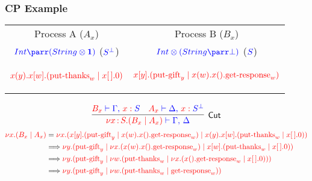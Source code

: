\documentclass{beamer}
\let\oldframetitle\frametitle
\renewcommand{\frametitle}[1]{
  \oldframetitle{#1}\vspace{-3.5cm}
}
\newcommand{\ftitle}[2]{\oldframetitle{#1}\vspace{-#2cm}}
\newcommand\CPFSize{\fontsize{7}{8.4}\selectfont}
\begin{document}
\begin{frame}[fragile]
\ftitle{CP Example}{0.5}
\begin{tabular*}{\textwidth}{@{\extracolsep{\fill}} cc}
Process A ($A_x$) & Process B ($B_x$)\\
$\colored\tp{Int \parr (String \otimes \1)}$
  ($\colored\tp{\dualbt{S}}$) &
$\colored\tp{Int \otimes (String \parr \bot)}$ ($\colored\tp{S}$)\\
\begin{cp}
$\colored\tm{x(y).x[w].(\mbox{put-thanks}_w \mid x[\,].0)}$
\end{cp} &
\begin{cp}
$\colored\tm{x[y].(\mbox{put-gift}_y \mid x(w).x().\mbox{get-response}_w)}$
\end{cp}
\end{tabular*}
\[\colored
\inference{
  \tm{B_x} \tpvdash \tp{\Gamma \comma \tmof{x}S}
  &
  \tm{A_x} \tpvdash \tp{\Delta \comma \tmof{x}\dualbt{S}}
}{Cut}{
  \tm{\nu x \of{S}.(B_x \mid A_x)} \tpvdash \tp{\Gamma \comma \Delta}
}
\]
\CPFSize
{}
\begin{align*}
  {\color{red}\nu x.(B_x \mid A_x)} & =
    {\color{red} \nu x.(x[y].(\mbox{put-gift}_y \mid x(w).x().\mbox{get-response}_w)
          \mid x(y).x[w].(\mbox{put-thanks}_w \mid x[\,].0))}
    \\
                            & \Longrightarrow
    {\color{red}\nu y.(\mbox{put-gift}_y \mid
               \nu x.(x(w).x().\mbox{get-response}_w) \mid
                      x[w].(\mbox{put-thanks}_w \mid x[\,].0))}
    \\
                            & \Longrightarrow
    {\color{red}\nu y.(\mbox{put-gift}_y \mid
               \nu w.(\mbox{put-thanks}_w \mid
                      \nu x.(x().\mbox{get-response}_w \mid x[\,].0)))}
    \\
                            & \Longrightarrow
    {\color{red}\nu y.(\mbox{put-gift}_y \mid
               \nu w.(\mbox{put-thanks}_w \mid \mbox{get-response}_w))}
\end{align*}
\end{frame}
\end{document}
